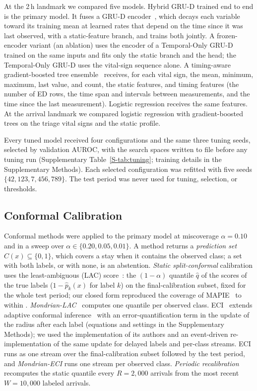 At the 2\,h landmark we compared five models. Hybrid GRU-D trained end to end is the primary model. It fuses a GRU-D encoder~\cite{che2018grud}, which decays each variable toward its training mean at learned rates that depend on the time since it was last observed, with a
static-feature branch, and trains both jointly. A frozen-encoder variant (an ablation) uses the encoder of a Temporal-Only GRU-D trained on
the same inputs and fits only the static branch and the head; the Temporal-Only GRU-D uses the vital-sign sequence alone. A timing-aware gradient-boosted
tree ensemble~\cite{chen2016xgboost} receives, for each vital sign, the mean, minimum, maximum, last value, and count, the static features, and
timing features (the number of ED rows, the time span and intervals between measurements, and the time since the last measurement). Logistic regression receives the same features. At the arrival
landmark we compared logistic regression with gradient-boosted trees on the triage vital signs and the static profile.

Every tuned model received four configurations and the same three tuning seeds, selected by validation AUROC, with the search spaces written to file before any tuning run (Supplementary Table~\ref{S-tab:tuning}; training details in the Supplementary Methods).
Each selected configuration was refitted with five seeds $\{42, 123, 7, 456, 789\}$. The test period was never used for tuning, selection, or thresholds.

\subsection{Conformal Calibration}
\label{sec:methods-conformal}

Conformal methods were applied to the primary model at miscoverage $\alpha = 0.10$ and in a sweep over $\alpha \in \{0.20, 0.05, 0.01\}$. A method returns a
\emph{prediction set} $\widehat{C}(x) \subseteq \{0,1\}$, which covers a stay when it contains the observed class; a set with both labels, or with none,
is an abstention. \emph{Static split-conformal} calibration uses
the least-ambiguous (LAC) score~\cite{sadinle2019lac}: the $(1-\alpha)$ quantile $\hat{q}$ of the scores of the true
labels ($1-\hat{p}_k(x)$ for label $k$) on the final-calibration subset, fixed for the whole test period; our closed form reproduced the coverage of MAPIE~\cite{cordier2023mapie} to within \RVStaticVsMapie{}. \emph{Mondrian-LAC}~\cite{vovk2003mondrian} computes one quantile per observed class.
ECI~\cite{wu2025eci} extends adaptive conformal inference~\cite{gibbs2021aci} with an error-quantification term in the update of the radius after each label (equations and settings in the Supplementary Methods); we used the implementation of its authors and an event-driven re-implementation of the same update for delayed labels and per-class streams. ECI runs as one stream over the
final-calibration subset followed by the test period, and \emph{Mondrian-ECI} runs one
stream per observed class. \emph{Periodic recalibration} recomputes the static quantile every $R = 2{,}000$ arrivals from the most recent $W = 10{,}000$ labeled arrivals.

